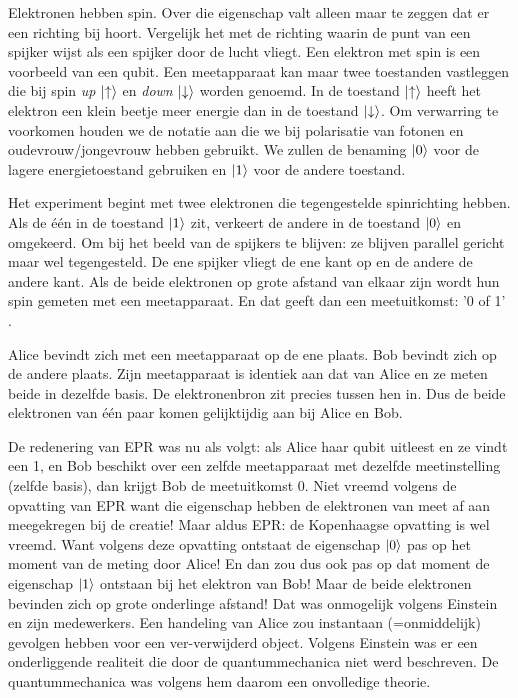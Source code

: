 \documentclass[../../main.tex]{subfiles}
\begin{document}
Elektronen hebben spin. Over die eigenschap valt alleen maar te zeggen dat er een richting bij hoort. Vergelijk het met de richting waarin de punt van een spijker wijst als een spijker door de lucht vliegt. Een elektron met spin is een voorbeeld van een qubit. Een meetapparaat kan maar twee toestanden vastleggen die bij spin \textit{up} $\ket{\uparrow}$ en \textit{down} $\ket{\downarrow}$ worden genoemd. In de toestand $\ket{\uparrow}$ heeft het elektron een klein beetje meer energie dan in de toestand $\ket{\downarrow}$. Om verwarring te voorkomen houden we de notatie aan die we bij polarisatie van fotonen en oudevrouw/jongevrouw hebben gebruikt. We zullen de benaming $\ket{0}$ voor de lagere energietoestand gebruiken en $\ket{1}$ voor de andere toestand. 

Het experiment begint met twee elektronen die tegengestelde spin\-richting hebben. Als de \'e\'en in de toestand $\ket{1}$ zit, verkeert de andere in de toestand $\ket{0}$ en omgekeerd. Om bij het beeld van de spijkers te blijven: ze blijven parallel gericht maar wel tegengesteld. De ene spijker vliegt de ene kant op en de andere de andere kant. Als de beide elektronen op grote afstand van elkaar zijn wordt hun spin gemeten met een meetapparaat. En dat geeft dan een meetuitkomst: '0 of 1' . 


Alice bevindt zich met een meetapparaat op de ene plaats. Bob bevindt zich op de andere plaats. Zijn meetapparaat is identiek  aan dat van Alice en ze meten beide in dezelfde basis. De elektronenbron zit precies tussen hen in. Dus de beide elektronen van één paar komen gelijktijdig aan bij Alice en Bob.

De redenering van EPR was nu als volgt: als Alice haar qubit uitleest en ze vindt een 1, en Bob beschikt over een zelfde meetapparaat met dezelfde meetinstelling (zelfde basis), dan krijgt Bob de meetuitkomst 0. Niet vreemd volgens de opvatting van EPR want die eigenschap hebben de elektronen van meet af aan meegekregen bij de creatie! Maar aldus EPR: de Kopenhaagse opvatting is wel vreemd. Want volgens deze opvatting ontstaat  de eigenschap $\ket{0}$ pas op het moment van de meting door Alice! En dan zou dus ook pas op dat moment de eigenschap $\ket{1}$ ontstaan bij het elektron van Bob! Maar de beide elektronen bevinden zich op grote onderlinge afstand! Dat was onmogelijk volgens Einstein en zijn medewerkers. Een handeling van Alice zou instantaan (=onmiddelijk) gevolgen hebben voor een ver-verwijderd object. Volgens Einstein was er een onderliggende realiteit die door de quantummechanica niet werd beschreven. De quantummechanica was volgens hem daarom een onvolledige theorie. 
\end{document}

